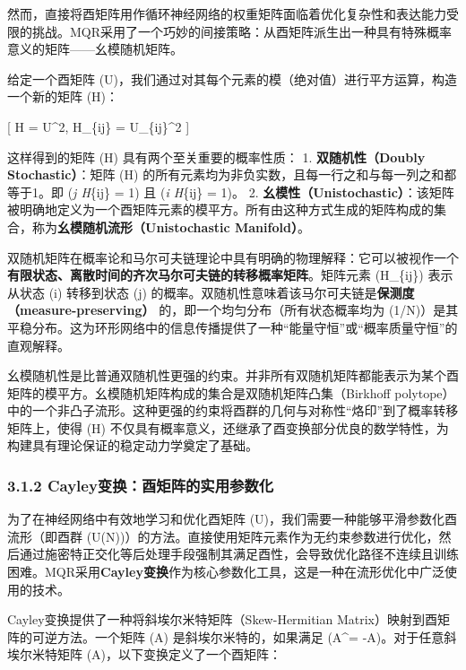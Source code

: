 \documentclass[
  12pt,
]{article}
\begin{document}
然而，直接将酉矩阵用作循环神经网络的权重矩阵面临着优化复杂性和表达能力受限的挑战。MQR采用了一个巧妙的间接策略：从酉矩阵派生出一种具有特殊概率意义的矩阵------幺模随机矩阵。

给定一个酉矩阵
(U)，我们通过对其每个元素的模（绝对值）进行平方运算，构造一个新的矩阵
(H)：

{[} H = \textbar U\textbar\^{}2, \quad {} \quad H\_\{ij\} =
\textbar U\_\{ij\}\textbar\^{}2 {]}

这样得到的矩阵 (H) 具有两个至关重要的概率性质： 1.
\textbf{双随机性（Doubly Stochastic）}：矩阵 (H)
的所有元素均为非负实数，且每一行之和与每一列之和都等于1。即 (\sum\emph{j
H}\{ij\} = 1) 且 (\sum\emph{i H}\{ij\} = 1)。 2.
\textbf{幺模性（Unistochastic）}：该矩阵被明确地定义为一个酉矩阵元素的模平方。所有由这种方式生成的矩阵构成的集合，称为\textbf{幺模随机流形（Unistochastic
Manifold）}。

双随机矩阵在概率论和马尔可夫链理论中具有明确的物理解释：它可以被视作一个\textbf{有限状态、离散时间的齐次马尔可夫链的转移概率矩阵}。矩阵元素
(H\_\{ij\}) 表示从状态 (i) 转移到状态 (j)
的概率。双随机性意味着该马尔可夫链是\textbf{保测度（measure-preserving）}
的，即一个均匀分布（所有状态概率均为
(1/N)）是其平稳分布。这为环形网络中的信息传播提供了一种``能量守恒''或``概率质量守恒''的直观解释。

幺模随机性是比普通双随机性更强的约束。并非所有双随机矩阵都能表示为某个酉矩阵的模平方。幺模随机矩阵构成的集合是双随机矩阵凸集（Birkhoff
polytope）中的一个非凸子流形。这种更强的约束将酉群的几何与对称性``烙印''到了概率转移矩阵上，使得
(H)
不仅具有概率意义，还继承了酉变换部分优良的数学特性，为构建具有理论保证的稳定动力学奠定了基础。

\hypertarget{cayleyux53d8ux6362ux9149ux77e9ux9635ux7684ux5b9eux7528ux53c2ux6570ux5316}{%
\subsubsection{3.1.2
Cayley变换：酉矩阵的实用参数化}\label{cayleyux53d8ux6362ux9149ux77e9ux9635ux7684ux5b9eux7528ux53c2ux6570ux5316}}

为了在神经网络中有效地学习和优化酉矩阵
(U)，我们需要一种能够平滑参数化酉流形（即酉群
(U(N))）的方法。直接使用矩阵元素作为无约束参数进行优化，然后通过施密特正交化等后处理手段强制其满足酉性，会导致优化路径不连续且训练困难。MQR采用\textbf{Cayley变换}作为核心参数化工具，这是一种在流形优化中广泛使用的技术。

Cayley变换提供了一种将斜埃尔米特矩阵（Skew-Hermitian
Matrix）映射到酉矩阵的可逆方法。一个矩阵 (A) 是斜埃尔米特的，如果满足
(A\^{}\dagger = -A)。对于任意斜埃尔米特矩阵
(A)，以下变换定义了一个酉矩阵：
\end{document}
